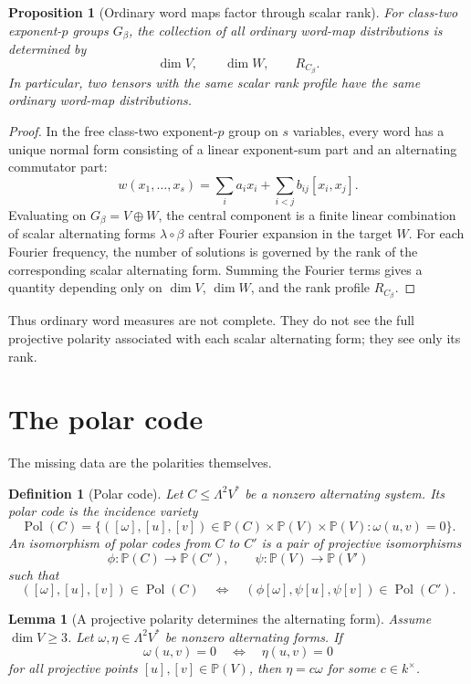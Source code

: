 \documentclass[11pt]{article}
\newtheorem{proposition}[theorem]{Proposition}
\newtheorem{definition}[theorem]{Definition}
\newtheorem{lemma}[theorem]{Lemma}
\begin{document}
\begin{proposition}[Ordinary word maps factor through scalar rank]
For class-two exponent-$p$ groups $G_\beta$, the collection of all ordinary word-map distributions is determined by
\[
\dim V,\qquad \dim W,\qquad R_{C_\beta}.
\]
In particular, two tensors with the same scalar rank profile have the same ordinary word-map distributions.
\end{proposition}

\begin{proof}
In the free class-two exponent-$p$ group on $s$ variables, every word has a unique normal form consisting of a linear exponent-sum part and an alternating commutator part:
\[
w(x_1,\ldots,x_s)
=
\sum_i a_ix_i
+\sum_{i<j}b_{ij}[x_i,x_j].
\]
Evaluating on $G_\beta=V\oplus W$, the central component is a finite linear combination of scalar alternating forms $\lambda\circ\beta$ after Fourier expansion in the target $W$. For each Fourier frequency, the number of solutions is governed by the rank of the corresponding scalar alternating form. Summing the Fourier terms gives a quantity depending only on $\dim V$, $\dim W$, and the rank profile $R_{C_\beta}$.
\end{proof}

Thus ordinary word measures are not complete. They do not see the full projective polarity associated with each scalar alternating form; they see only its rank.

\section{The polar code}

The missing data are the polarities themselves.

\begin{definition}[Polar code]
Let $C\le\Lambda^2V^*$ be a nonzero alternating system. Its polar code is the incidence variety
\[
\operatorname{Pol}(C)
=
\{([\omega],[u],[v])\in
\mathbb P(C)\times\mathbb P(V)\times\mathbb P(V):
\omega(u,v)=0\}.
\]
An isomorphism of polar codes from $C$ to $C'$ is a pair of projective isomorphisms
\[
\phi:\mathbb P(C)\to\mathbb P(C'),
\qquad
\psi:\mathbb P(V)\to\mathbb P(V')
\]
such that
\[
([\omega],[u],[v])\in\operatorname{Pol}(C)
\quad\Longleftrightarrow\quad
(\phi[\omega],\psi[u],\psi[v])\in\operatorname{Pol}(C').
\]
\end{definition}

\begin{lemma}[A projective polarity determines the alternating form]
Assume $\dim V\ge3$. Let $\omega,\eta\in\Lambda^2V^*$ be nonzero alternating forms. If
\[
\omega(u,v)=0
\quad\Longleftrightarrow\quad
\eta(u,v)=0
\]
for all projective points $[u],[v]\in\mathbb P(V)$, then $\eta=c\omega$ for some $c\in k^\times$.
\end{lemma}
\end{document}
